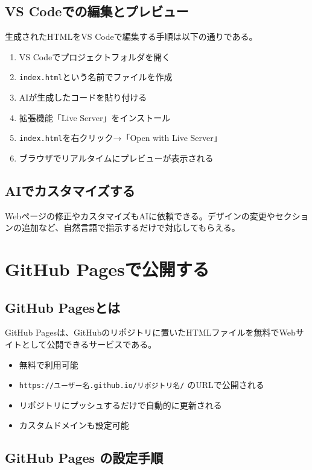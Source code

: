 \subsection{VS Codeでの編集とプレビュー}

生成されたHTMLをVS Codeで編集する手順は以下の通りである。

\begin{enumerate}
\item VS Codeでプロジェクトフォルダを開く
\item \texttt{index.html}という名前でファイルを作成
\item AIが生成したコードを貼り付ける
\item 拡張機能「Live Server」をインストール
\item \texttt{index.html}を右クリック→「Open with Live Server」
\item ブラウザでリアルタイムにプレビューが表示される
\end{enumerate}

\subsection{AIでカスタマイズする}

Webページの修正やカスタマイズもAIに依頼できる。デザインの変更やセクションの追加など、自然言語で指示するだけで対応してもらえる。

\section{GitHub Pagesで公開する}

\subsection{GitHub Pagesとは}

GitHub Pagesは、GitHubのリポジトリに置いたHTMLファイルを無料でWebサイトとして公開できるサービスである。

\begin{itemize}
\item 無料で利用可能
\item \texttt{https://ユーザー名.github.io/リポジトリ名/} のURLで公開される
\item リポジトリにプッシュするだけで自動的に更新される
\item カスタムドメインも設定可能
\end{itemize}

\subsection{GitHub Pages の設定手順}

